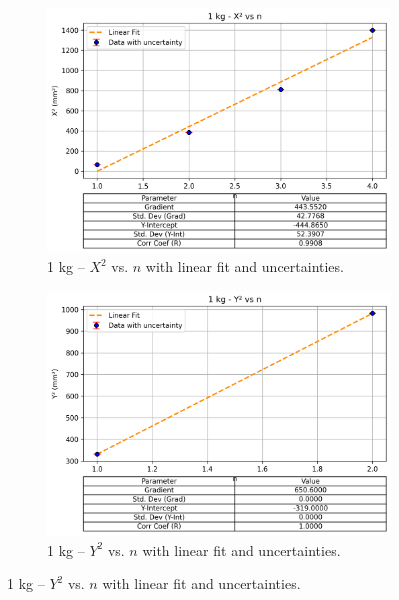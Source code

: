 \documentclass[a4paper,11pt]{article}
\begin{document}
\begin{figure}[H]
  \centering
  \begin{subfigure}[b]{0.45\textwidth}
    \centering
    \includegraphics[width=\textwidth]{1kg_X2_vs_n_with_errorbar.png}
    \caption{1 kg -- \(X^2\) vs. \(n\) with linear fit and uncertainties.}
    \label{fig:1kgX2vsn}
  \end{subfigure}
  \hfill
  \begin{subfigure}[b]{0.45\textwidth}
    \centering
    \includegraphics[width=\textwidth]{1kg_Y2_vs_n_with_errorbar.png}
    \caption{1 kg -- \(Y^2\) vs. \(n\) with linear fit and uncertainties.}
    \label{fig:1kgY2vsn}
  \end{subfigure}
  

\end{figure}
\end{document}
